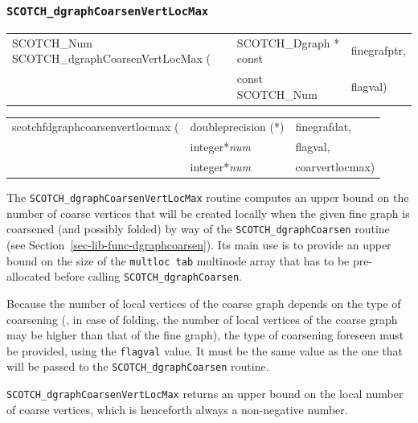 \subsubsection{{\tt SCOTCH\_dgraphCoarsenVertLocMax}}
\label{sec-lib-func-dgraphcoarsenvertlocmax}

\begin{itemize}
\progsyn

{\tt\begin{tabular}{l@{}ll}
SCOTCH\_Num SCOTCH\_dgraphCoarsenVertLocMax ( & SCOTCH\_Dgraph * const & finegrafptr, \\
                                              & const SCOTCH\_Num      & flagval) \\
\end{tabular}}

{\tt\begin{tabular}{l@{}ll}
scotchfdgraphcoarsenvertlocmax ( & doubleprecision (*) & finegrafdat, \\
                                 & integer*{\it num}   & flagval,     \\
                                 & integer*{\it num}   & coarvertlocmax)
\end{tabular}}

\progdes

The \texttt{SCOTCH\_dgraphCoarsen\lbt Vert\lbt Loc\lbt Max} routine
computes an upper bound on the number of coarse vertices that will be
created locally when the given fine graph is coarsened (and possibly
folded) by way of the \texttt{SCOTCH\_dgraph\lbt Coarsen} routine
(see Section~\ref{sec-lib-func-dgraphcoarsen}). Its main use is
to provide an upper bound on the size of the \texttt{mult\lbt loc\lbt
  tab} multinode array that has to be pre-allocated before calling
\texttt{SCOTCH\_dgraph\lbt Coarsen}.

Because the number of local vertices of the coarse graph depends on
the type of coarsening (\eg, in case of folding, the number of local
vertices of the coarse graph may be higher than that of the fine
graph), the type of coarsening foreseen must be provided, using
the \texttt{flagval} value. It must be the same value as the one
that will be passed to the \texttt{SCOTCH\_dgraph\lbt Coarsen}
routine.

\progret

\texttt{SCOTCH\_dgraphCoarsen\lbt Vert\lbt Loc\lbt Max} returns an
upper bound on the local number of coarse vertices, which is
henceforth always a non-negative number.
\end{itemize}


